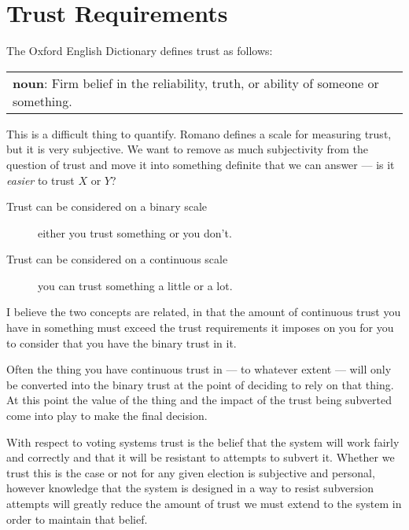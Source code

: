 \section{Trust Requirements}
\label{ch:req:trust}

The Oxford English Dictionary defines trust as follows:

\vspace{1em}
\noindent \begin{tabular}{|p{}}
    \noindent \textbf{noun}: Firm belief in the reliability, truth, or ability of someone or something.
\end{tabular}
\vspace{1em}

This is a difficult thing to quantify. Romano \cite{romano_nature_2003} defines a scale for measuring trust, but it is very subjective. We want to remove as much subjectivity from the question of trust and move it into something definite that we can answer --- is it \emph{easier} to trust $X$ or $Y$?

\begin{description}
    \item[Trust can be considered on a binary scale] either you trust something or you don't.
    \item[Trust can be considered on a continuous scale] you can trust something a little or a lot.
\end{description}

I believe the two concepts are related, in that the amount of continuous trust you have in something must exceed the trust requirements it imposes on you for you to consider that you have the binary trust in it.

Often the thing you have continuous trust in --- to whatever extent --- will only be converted into the binary trust at the point of deciding to rely on that thing. At this point the value of the thing and the impact of the trust being subverted come into play to make the final decision.

With respect to voting systems trust is the belief that the system will work fairly and correctly and that it will be resistant to attempts to subvert it. Whether we trust this is the case or not for any given election is subjective and personal, however knowledge that the system is designed in a way to resist subversion attempts will greatly reduce the amount of trust we must extend to the system in order to maintain that belief.

